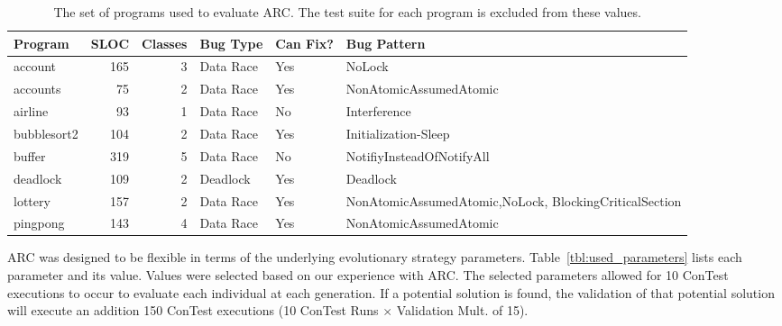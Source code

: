 \begin{table}[h]
\caption{The set of programs used to evaluate ARC. The test suite for each program is excluded from these values.}
\begin{center}
\begin{tabular}{|l|r|r|l|l|p{4.5cm}|}
\hline
\textbf{Program} & \textbf{SLOC} & \textbf{Classes} & \textbf{Bug Type} & \textbf{Can Fix?} & \textbf{Bug Pattern}\\
\hline
account & 165 & 3 & Data Race & Yes & NoLock\\
\hline
accounts & 75 & 2 & Data Race & Yes & NonAtomicAssumedAtomic\\
\hline
airline & 93 & 1 & Data Race & No & Interference\\
\hline
bubblesort2 & 104 & 2 & Data Race & Yes & Initialization-Sleep\\
\hline
buffer & 319 & 5 & Data Race & No & NotifiyInsteadOfNotifyAll\\
\hline
deadlock & 109 & 2 & Deadlock & Yes & Deadlock\\
\hline
lottery & 157 & 2 & Data Race & Yes & NonAtomicAssumedAtomic,\newline NoLock, BlockingCriticalSection\\
\hline
pingpong & 143 & 4 & Data Race & Yes & NonAtomicAssumedAtomic\\
\hline
\end{tabular}
\label{tbl:used_programs}
\end{center}
\end{table}

ARC was designed to be flexible in terms of the underlying evolutionary strategy parameters. Table~\ref{tbl:used_parameters} lists each parameter and its value. Values were selected based on our experience with ARC. The selected parameters allowed for 10 ConTest executions to occur to evaluate each individual at each generation. If a potential solution is found, the validation of that potential solution will execute an addition 150 ConTest executions (10 ConTest Runs $\times$ Validation Mult. of
15).

